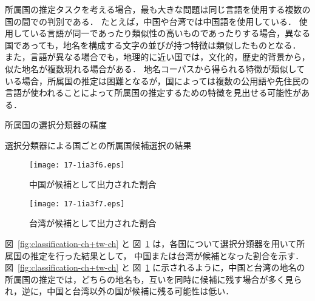 \documentclass[japanese]{jnlp_1.4}
\begin{document}
所属国の推定タスクを考える場合，最も大きな問題は同じ言語を使用する複数の国の間での判別である．
たとえば，中国や台湾では中国語を使用している．
使用している言語が同一であったり類似性の高いものであったりする場合，異なる国であっても，地名を構成する文字の並びが持つ特徴は類似したものとなる．
また，言語が異なる場合でも，地理的に近い国では，文化的，歴史的背景から，似た地名が複数現れる場合がある．
地名コーパスから得られる特徴が類似している場合，所属国の推定は困難となるが，国によっては複数の公用語や先住民の言語が使われることによって所属国の推定するための特徴を見出せる可能性がある．

\begin{table}[b]
\hfill
\begin{minipage}[t]{150pt}
 \caption{所属国の選択分類器の精度}
 \label{tab:accuracy-svm}

\end{minipage}
\hfill
\begin{minipage}[t]{240pt}
  \caption{選択分類器による国ごとの所属国候補選択の結果}
  \label{tab:fmeasure-svm}

\end{minipage}
\hfill
\end{table}
\begin{figure}[b]
\begin{minipage}[t]{.48\textwidth}
  \begin{center}
  \texttt{[image: 17-1ia3f6.eps]}
  \end{center}
   \caption{中国が候補として出力された割合}
   \label{fig:classification-ch+tw-ch}
 \end{minipage}
 \hfill
 \begin{minipage}[t]{.48\textwidth}
  \begin{center}
  \texttt{[image: 17-1ia3f7.eps]}
  \end{center}
   \caption{台湾が候補として出力された割合}
   \label{fig:classification-ch+tw-tw}
 \end{minipage}
\end{figure}

図~\ref{fig:classification-ch+tw-ch} と 図~\ref{fig:classification-ch+tw-tw} は，各国について選択分類器を用いて所属国の推定を行った結果として，
中国または台湾が候補となった割合を示す．
図~\ref{fig:classification-ch+tw-ch} と 図~\ref{fig:classification-ch+tw-tw} に示されるように，中国と台湾の地名の所属国の推定では，どちらの地名も，互いを同時に候補に残す場合が多く見られ，逆に，中国と台湾以外の国が候補に残る可能性は低い．
\end{document}
